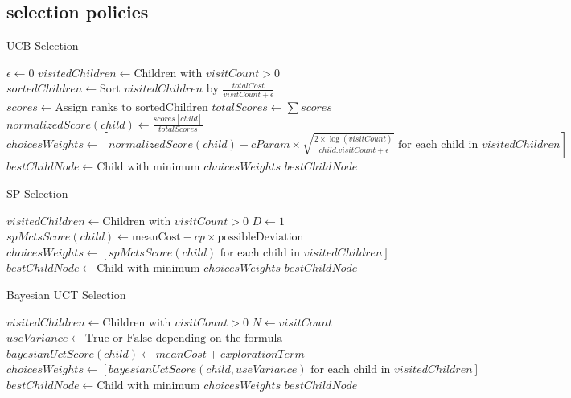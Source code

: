 \subsection{selection policies} %
\label{sub:selection policies}


\begin{algorithm}[H]
    \caption{UCB Selection}
    \label{alg:UCB}
    \begin{algorithmic}[1]
        \STATE $\epsilon \leftarrow 0$
        \STATE $visitedChildren \leftarrow \text{Children with } visitCount > 0$
        \STATE $sortedChildren \leftarrow \text{Sort } visitedChildren \text{ by } \frac{totalCost}{visitCount + \epsilon}$
        \STATE $scores \leftarrow \text{Assign ranks to sortedChildren}$
        \STATE $totalScores \leftarrow \sum scores$
        \STATE $normalizedScore(child) \leftarrow \frac{scores[child]}{totalScores}$
        \STATE $choicesWeights \leftarrow \left[ normalizedScore(child) + cParam \times \sqrt{\frac{2 \times \log(visitCount)}{child.visitCount + \epsilon}} \text{ for each child in } visitedChildren \right]$
        \STATE $bestChildNode \leftarrow \text{Child with minimum } choicesWeights$
        \RETURN $bestChildNode$
    \end{algorithmic}
\end{algorithm}

\begin{algorithm}[H]
    \caption{SP Selection}
    \label{alg:SP}
    \begin{algorithmic}[1]
        \STATE $visitedChildren \leftarrow \text{Children with } visitCount > 0$
        \STATE $D \leftarrow 1$
        \STATE $spMctsScore(child) \leftarrow \text{meanCost} - cp \times \text{possibleDeviation}$
        \STATE $choicesWeights \leftarrow \left[ spMctsScore(child) \text{ for each child in } visitedChildren \right]$
        \STATE $bestChildNode \leftarrow \text{Child with minimum } choicesWeights$
        \RETURN $bestChildNode$
    \end{algorithmic}
\end{algorithm}

\begin{algorithm}[H]
    \caption{Bayesian UCT Selection}
    \label{alg:Bayesian}
    \begin{algorithmic}[1]
        \STATE $visitedChildren \leftarrow \text{Children with } visitCount > 0$
        \STATE $N \leftarrow visitCount$
        \STATE $useVariance \leftarrow \text{True or False depending on the formula}$
        \STATE $bayesianUctScore(child) \leftarrow meanCost + explorationTerm$
        \STATE $choicesWeights \leftarrow \left[ bayesianUctScore(child, useVariance) \text{ for each child in } visitedChildren \right]$
        \STATE $bestChildNode \leftarrow \text{Child with minimum } choicesWeights$
        \RETURN $bestChildNode$
    \end{algorithmic}
\end{algorithm}

